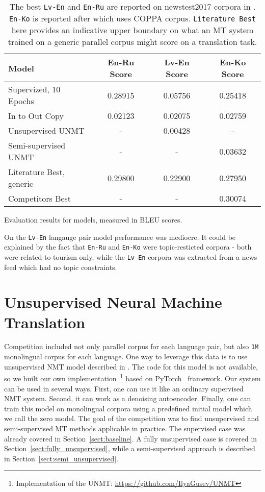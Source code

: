 \documentclass[]{article}
\begin{document}
\begin{table}
\begin{center}
\begin{tabular}{ l c c c }
Model & En-Ru Score & Lv-En Score & En-Ko Score \\
\hline
Supervized, 10 Epochs & 0.28915 & 0.05756 & 0.25418 \\
In to Out Copy & 0.02123 & 0.02075 & 0.02759 \\
Unsupervised UNMT & - & 0.00428 & - \\
Semi-supervised UNMT & - & - & 0.03632 \\
Literature Best, generic & 0.29800 & 0.22900 & 0.27950 \\
Competitors Best & - & - & 0.30074
\end{tabular}
\end{center}
\caption{Evaluation results for models, measured in BLEU scores.}
\caption*{\small
The best {\tt Lv-En} and  {\tt En-Ru} are reported on newstest2017 corpora in \cite{bojar2017findings}.
{\tt En-Ko} is reported after \cite{junczys2016coppa} which uses COPPA corpus.
{\tt Literature Best} here provides an indicative upper boundary on what an \acf{MT} system trained on a generic parallel corpus might score on a translation task.
}
\label{table:results}
\end{table}

On the {\tt Lv-En} langauge pair model performance was mediocre.
It could be explained by the fact that {\tt En-Ru} and {\tt En-Ko} were topic-resticted corpora - both were related to tourism only, while the {\tt Lv-En} corpora was extracted from a news feed which had no topic constraints.

\section{Unsupervised Neural Machine Translation}
\label{sect:unmt}

Competition included not only parallel corpus for each language pair, but also {\tt 1M} monolingual corpus for each language.
One way to leverage this data is to use unsupervised \ac{NMT} model described in \cite{DBLP:journals/corr/abs-1711-00043}.
The code for this model is not available, so we built our own implementation~\footnote{Implementation of the \acs{UNMT}: \url{https://github.com/IlyaGusev/UNMT}} based on PyTorch~\citep{paszke2017automatic} framework. 
Our system can be used in several ways.
First, one can use it like an ordinary supervised \ac{NMT} system.
Second, it can work as a denoising autoencoder.
Finally, one can train this model on monolingual corpora using a predefined initial model which we call the zero model.
The goal of the competition was to find unsupervised and semi-supervised \ac{MT} methods applicable in practice.
The supervised case was already covered in Section~\ref{sect:baseline}.
A fully unsupervised case is covered in Section~\ref{sect:fully_unsupervised}, while a semi-supervised approach is described in Section~\ref{sect:semi_unsupervised}.
\end{document}

